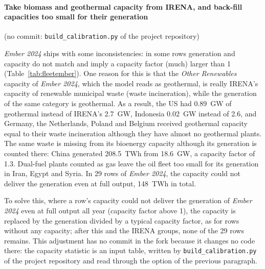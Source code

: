 \paragraph{Take biomass and geothermal capacity from IRENA, and back-fill capacities too small for their generation} (no commit: \texttt{build\_calibration.py} of the project repository)

\textit{Ember 2024} ships with some inconsistencies: in some rows generation and capacity do not match and imply a capacity factor (much) larger than 1 (Table~\ref{tab:fleetember}).
One reason for this is that the \emph{Other Renewables} capacity of \textit{Ember 2024}, which the model reads as geothermal, is really IRENA's capacity of renewable municipal waste (waste incineration), while the generation of the same category is geothermal.
As a result, the US had \SI{0.89}{GW} of geothermal instead of IRENA's \SI{2.7}{GW}, Indonesia \SI{0.02}{GW} instead of 2.6, and Germany, the Netherlands, Poland and Belgium received geothermal capacity equal to their waste incineration although they have almost no geothermal plants.
The same waste is missing from its bioenergy capacity although its generation is counted there: China generated \SI{208.5}{TWh} from \SI{18.6}{GW}, a capacity factor of 1.3.
Dual-fuel plants counted as gas leave the oil fleet too small for its generation in Iran, Egypt and Syria.
In 29 rows of \textit{Ember 2024}, the capacity could not deliver the generation even at full output, \SI{148}{TWh} in total.

\begin{table}[htb]
  \centering\small
  \caption{Rows of Ember's Yearly Electricity Data for 2024 (\textit{Ember 2024}, \citealp{ember2025}) whose capacity is too small for their generation, largest shortfall first, and the value the capacity statistic now carries; TWh: generation of 2024.
  Rows with zero capacity were already back-filled before and are not listed.}
  \label{tab:fleetember}
  
\end{table}

To solve this, where a row's capacity could not deliver the generation of \textit{Ember 2024} even at full output all year (capacity factor above 1), the capacity is replaced by the generation divided by a typical capacity factor, as for rows without any capacity; after this and the IRENA groups, none of the 29 rows remains.
This adjustment has no commit in the fork because it changes no code there: the capacity statistic is an input table, written by \texttt{build\_calibration.py} of the project repository and read through the option of the previous paragraph.

